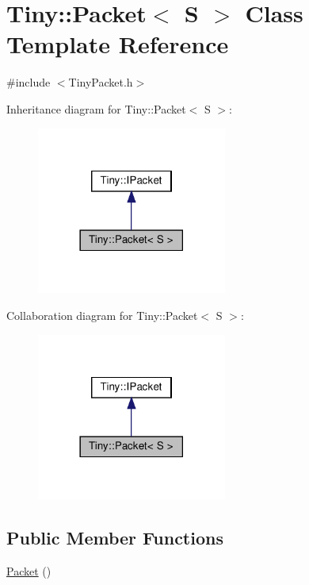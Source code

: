 \hypertarget{classTiny_1_1Packet}{}\section{Tiny\+:\+:Packet$<$ S $>$ Class Template Reference}
\label{classTiny_1_1Packet}


{\ttfamily \#include $<$Tiny\+Packet.\+h$>$}



Inheritance diagram for Tiny\+:\+:Packet$<$ S $>$\+:
\nopagebreak
\begin{figure}[H]
\begin{center}
\leavevmode
\includegraphics[width=177pt]{classTiny_1_1Packet__inherit__graph}
\end{center}
\end{figure}


Collaboration diagram for Tiny\+:\+:Packet$<$ S $>$\+:
\nopagebreak
\begin{figure}[H]
\begin{center}
\leavevmode
\includegraphics[width=177pt]{classTiny_1_1Packet__coll__graph}
\end{center}
\end{figure}
\subsection*{Public Member Functions}
\begin{DoxyCompactItemize}
\item 
\hyperlink{classTiny_1_1Packet_a81a8b302018e7091616e5c853b005201}{Packet} ()
\end{DoxyCompactItemize}


